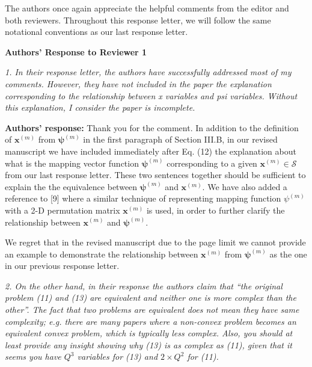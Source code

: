 \documentclass[onecolumn, 11pt, draftclsnofoot]{IEEEtran}
\begin{document}
The authors once again appreciate the helpful comments from the editor and both
reviewers.
Throughout this response letter, we will follow the same notational
conventions as our last response letter.

\begin{center}
  {\LARGE \textbf{Authors' Response to Reviewer 1}}
\end{center}


 
\noindent
\emph{1. In their response letter, the authors have successfully addressed most
of my comments. However, they have not included in the paper the explanation
corresponding to the relationship between x variables and psi variables. Without
this explanation, I consider the paper is incomplete.}

\noindent \textbf{Authors' response:} 
Thank you for the comment. In addition to the definition of $\mathbf{x}^{(m)}$
from $\bm{\psi}^{(m)}$ in the first paragraph of Section III.B, in our revised
manuscript we have included immediately after Eq. (12) the explanation about
what is the mapping vector function $\bm{\psi}^{(m)}$ corresponding to a given
$\mathbf{x}^{(m)}\in\mathcal{S}$ from our last response letter. These two
sentences together should be sufficient to explain the the equivalence between
$\bm{\psi}^{(m)}$ and $\mathbf{x}^{(m)}$. We have also added a reference to [9]
where a similar technique of representing mapping function $\psi^{(m)}$ with a
2-D permutation matrix $\mathbf{x}^{(m)}$ is used, in order to further clarify
the relationship between $\mathbf{x}^{(m)}$ and $\bm{\psi}^{(m)}$.

We regret that in the revised manuscript due to the page limit we cannot provide
an example to demonstrate the relationship between $\mathbf{x}^{(m)}$
from $\bm{\psi}^{(m)}$ as the one in our previous response letter.
\vspace{0.5cm}

\noindent
\emph{2. On the other hand, in their response the authors claim that ``the
original problem (11) and (13) are equivalent and neither one is more complex
than the other''. The fact that two problems are equivalent does not mean they
have same complexity; e.g. there are many papers where a non-convex problem
becomes an equivalent convex problem, which is typically less complex.  Also,
you should at least provide any insight showing why (13) is as complex as (11),
given that it seems you have $Q^3$ variables for (13) and $2\times Q^2$ for
(11).}
\end{document}
